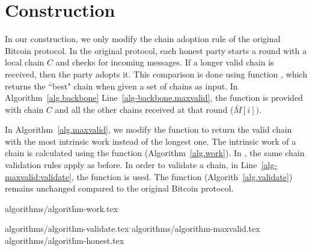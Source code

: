 \section{Construction}
In our construction, we only modify the chain adoption rule
of the original Bitcoin protocol.
In the original protocol, each honest party starts a round with a local chain
$C$ and checks for incoming messages. If a longer valid chain is received, then
the party adopts it. This comparison is done using function \maxvalid,
which returns the ``best" chain when given a set of chains as input.
In Algorithm~\ref{alg.backbone} Line~\ref{alg-backbone.maxvalid}, the
\maxvalid function is provided with chain $C$ and all the other chains received at that
round ($\bar M[i])$.

In Algorithm~\ref{alg.maxvalid}, we modify the \maxvalid function to return the valid
chain with the most intrinsic work instead of the longest one. The intrinsic work
of a chain is calculated using the \work function (Algorithm~\ref{alg.work}).
In \maxvalid, the same chain validation rules apply as before. In order to
validate a chain, in Line~\ref{alg-maxvalid:validate}, the \validate function is used.
The \validate function (Algorith~\ref{alg.validate}) remains unchanged compared to
the original Bitcoin protocol.


{algorithms/algorithm-work.tex}

{algorithms/algorithm-validate.tex}
{algorithms/algorithm-maxvalid.tex}
{algorithms/algorithm-honest.tex}

